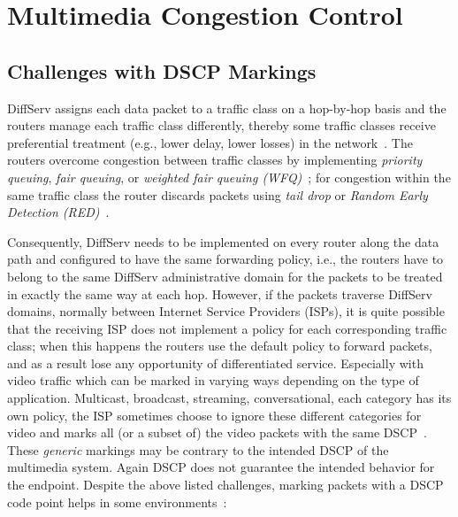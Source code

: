 
\section{Multimedia Congestion Control}



\subsection{Challenges with DSCP Markings}

DiffServ assigns each data packet to a traffic class on a hop-by-hop basis and
the routers manage each traffic class differently, thereby some traffic
classes receive preferential treatment (e.g., lower delay, lower losses) in
the network~\cite{rfc2475}. The routers overcome congestion between traffic
classes by implementing \emph{priority queuing}, \emph{fair queuing}, or
\emph{weighted fair queuing (WFQ)}~\cite{rfc4594}; for congestion within the
same traffic class the router discards packets using \emph{tail drop} or
\emph{Random Early Detection (RED)}~\cite{Floyd:RED}.


Consequently, DiffServ needs to be implemented on every router along the data
path and configured to have the same forwarding policy, i.e., the routers have
to belong to the same DiffServ administrative domain for the packets to be
treated in exactly the same way at each hop. However, if the packets traverse
DiffServ domains, normally between Internet Service Providers (ISPs), it is
quite possible that the receiving ISP does not implement a policy for each
corresponding traffic class; when this happens the routers use the default
policy to forward packets, and as a result lose any opportunity of
differentiated service. Especially with video traffic which can be marked in
varying ways depending on the type of application. Multicast, broadcast,
streaming, conversational, each category has its own policy, the ISP sometimes
choose to ignore these different categories for video and marks all (or a
subset of) the video packets with the same DSCP~\cite{rfc5865}. These
\emph{generic} markings may be contrary to the intended DSCP of the multimedia
system. Again DSCP does not guarantee the intended behavior for the endpoint.
Despite the above listed challenges, marking packets with a DSCP code point
helps in some environments~\cite{draft.rtcweb.qos}:

